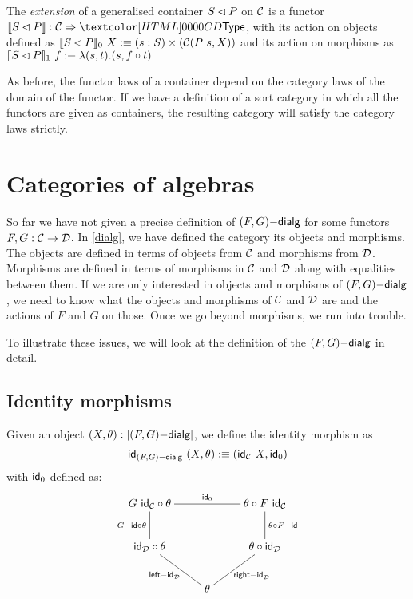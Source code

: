 \begin{definition}
  The \emph{extension} of a generalised container $S \lhd P$ on
  $\mathcal{C}$ is a functor $\context{\cont{S}{P}} : \Func{\Cc}{\Type}$, with
  its action on objects defined as
  $\llbracket S \lhd P \rrbracket_0\ X :\equiv (s : S) \times (\mathcal{C}(P\ s, X))$
  and its action on morphisms as
  $\llbracket S \lhd P \rrbracket_1\ f :\equiv \lambda (s , t) . (s , f \circ
  t)$
\end{definition}

As before, the functor laws of a container depend on the category laws
of the domain of the functor. If we have a definition of a sort
category in which all the functors are given as containers, the
resulting category will satisfy the category laws strictly.

\section{Categories of algebras}

So far we have not given a precise definition of $(F,G)\mathsf{-dialg}$ for
some functors $F, G : \mathcal{C} \to \mathcal{D}$. In \cref{dialg}, we have defined
the category its objects and morphisms. The objects are defined in
terms of objects from $\mathcal{C}$ and morphisms from $\mathcal{D}$. Morphisms are
defined in terms of morphisms in $\mathcal{C}$ and $\mathcal{D}$ along with equalities
between them. If we are only interested in objects and morphisms of
$(F,G)\mathsf{-dialg}$, we need to know what the objects and morphisms of
$\mathcal{C}$ and $\mathcal{D}$ are and the actions of $F$ and $G$ on those. Once we
go beyond morphisms, we run into trouble.

To illustrate these issues, we will look at the definition of the
$(F,G)\mathsf{-dialg}$ in detail. 

\subsection{Identity morphisms}

Given an object $(X,\theta) : | (F,G)\mathsf{-dialg} |$, we define the
identity morphism as
$$
\mathsf{id}_{(F,G)\mathsf{-dialg}}\ (X,\theta) :\equiv (\mathsf{id}_{\mathcal{C}}\ X , \mathsf{id}_0)
$$
with $\mathsf{id}_0$ defined as:
$$
\xymatrix{
G\ \id_\Cc \circ \theta
\ar@{-}[rr]^{\id_0}
\ar@{-}[d]_{\Gid \circ \theta}
&
&\theta \circ F\ \id_\Cc
\ar@{-}[d]^{\theta \circ \Fid}
\\
\id_\Dd \circ \theta
\ar@{-}[dr]_{\leftid_{\Dd}}
&
&\theta \circ \id_\Dd
\ar@{-}[dl]^{\rightid_{\Dd}}
\\
&\theta
&
}
$$

